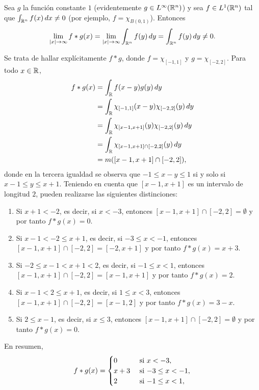\documentclass[a4paper, 11pt, oneside]{report}
\begin{document}
\begin{example}
  Sea $g$ la función constante $1$ (evidentemente $g \in L^\infty(\mathbb R^n)$) y sea $f \in L^1(\mathbb R^n)$ tal que $\int_{\mathbb R^n} f(x) \, dx \neq 0$ (por ejemplo, $f = \chi_{B(0,1)}$). Entonces
  \[\lim_{|x| \to \infty} f \ast g(x)=\lim_{|x| \to \infty} \int_{\mathbb R^n} f(y) \, dy =  \int_{\mathbb R^n} f(y) \, dy \neq 0.\]
\end{example}

\begin{example}
  Se trata de hallar explícitamente $f \ast g$, donde $f = \chi_{[-1,1]}$ y $g = \chi_{[-2,2]}$. Para todo $x \in \mathbb R$,
  \[\begin{aligned}[t]
    f \ast g(x) &= \int_\mathbb R f(x-y)g(y) \, dy \\
    &= \int_\mathbb R \chi_{[-1,1]}(x-y)\chi_{[-2,2]}(y) \, dy \\
    &= \int_{\mathbb R}\chi_{[x-1,x+1]}(y)\chi_{[-2,2]}(y) \, dy \\
    &= \int_{\mathbb R} \chi_{[x-1,x+1] \cap [-2,2]}(y) \, dy \\
    &= m([x-1,x+1] \cap [-2,2]),
  \end{aligned}\]
  donde en la tercera igualdad se observa que $-1 \leq x-y \leq 1$ si y solo si $x-1 \leq y \leq x+1$. Teniendo en cuenta que $[x-1,x+1]$ es un intervalo de longitud $2$, pueden realizarse las siguientes distinciones:
  \begin{enumerate}
    \item Si $x+1 < -2$, es decir, si $x < -3$, entonces $[x-1,x+1] \cap [-2,2] = \emptyset$ y por tanto $f \ast g(x) = 0$.
    \item Si $x-1 < -2 \leq x+1$, es decir, si $-3 \leq x < -1$, entonces $[x-1,x+1] \cap [-2,2] = [-2,x+1]$ y por tanto $f \ast g(x) = x+3$.
    \item Si $-2 \leq x-1 < x+1 < 2$, es decir, si $-1 \leq x < 1$, entonces $[x-1,x+1] \cap [-2,2] = [x-1,x+1]$ y por tanto $f \ast g(x)=2$.
    \item Si $x-1 < 2 \leq x+1$, es decir, si $1 \leq x < 3$, entonces $[x-1,x+1] \cap [-2,2] = [x-1,2]$ y por tanto $f \ast g(x)=3-x$.
    \item Si $2 \leq x-1$, es decir, si $x \leq 3$, entonces $[x-1,x+1] \cap [-2,2] = \emptyset$ y por tanto $f\ast g(x)=0$.
  \end{enumerate}
  En resumen,
  \[f \ast g(x)= \begin{cases}
    0 & $ si $ x < -3, \\
    x+3 & $ si $ -3 \leq x < -1, \\
    2 & $ si $ -1 \leq x < 1, \\

\end{cases}\]
\end{example}
\end{document}
